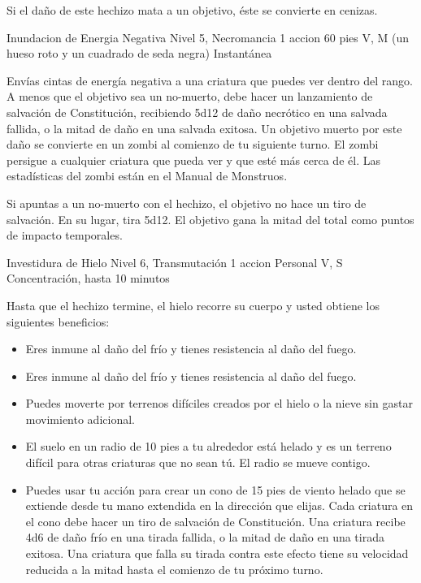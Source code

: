\documentclass[a4paper,twocolumn,openany,10pt]{dndbook}
\begin{document}
	Si el daño de este hechizo mata a un objetivo, éste se convierte en cenizas. 

\spellheader%
	{Inundacion de Energia Negativa}
	{Nivel 5, Necromancia}
	{1 accion}
	{60 pies}
	{V, M (un hueso roto y un cuadrado de seda negra)}
	{Instantánea}
	
	Envías cintas de energía negativa a una criatura que puedes ver dentro del rango. A menos que el objetivo sea un no-muerto,
	debe hacer un lanzamiento de salvación de Constitución, recibiendo 5d12 de daño necrótico en una salvada fallida, o la mitad
	de daño en una salvada exitosa. Un objetivo muerto por este daño se convierte en un zombi al comienzo de tu siguiente turno.
	El zombi persigue a cualquier criatura que pueda ver y que esté más cerca de él. Las estadísticas del zombi están en el
	Manual de Monstruos.
	
	Si apuntas a un no-muerto con el hechizo, el objetivo no hace un tiro de salvación. En su lugar, tira 5d12. El objetivo gana
	la mitad del total como puntos de impacto temporales. 

\spellheader%
	{Investidura de Hielo}
	{Nivel 6, Transmutación}
	{1 accion}
	{Personal}
	{V, S}
	{Concentración, hasta 10 minutos}

	Hasta que el hechizo termine, el hielo recorre su cuerpo y usted obtiene los siguientes beneficios:
	\begin{itemize}
		\item Eres inmune al daño del frío y tienes resistencia al daño del fuego.

		\item Eres inmune al daño del frío y tienes resistencia al daño del fuego.

		\item Puedes moverte por terrenos difíciles creados por el hielo o la nieve sin gastar movimiento adicional.

		\item El suelo en un radio de 10 pies a tu alrededor está helado y es un terreno difícil para otras criaturas que no
		sean tú. El radio se mueve contigo.

		\item Puedes usar tu acción para crear un cono de 15 pies de viento helado que se extiende desde tu mano extendida en la
		dirección que elijas. Cada criatura en el cono debe hacer un tiro de salvación de Constitución. Una criatura recibe 4d6
		de daño frío en una tirada fallida, o la mitad de daño en una tirada exitosa. Una criatura que falla su tirada contra
		este efecto tiene su velocidad reducida a la mitad hasta el comienzo de tu próximo turno. 
	\end{itemize}
\end{document}
